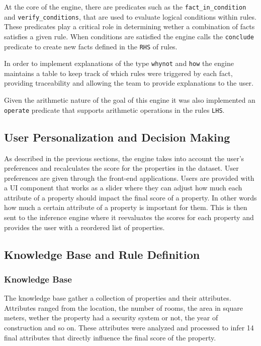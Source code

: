 \documentclass[runningheads]{llncs}
\begin{document}
At the core of the engine, there are predicates such as the \texttt{fact\_in\_condition} and \texttt{verify\_conditions}, that are used to evaluate logical conditions within rules. These predicates play a critical role in determining wether a combination of facts satisfies a given rule.
When conditions are satisfied the engine calls the \texttt{conclude} predicate to create new facts defined in the \texttt{RHS} of rules.

In order to implement explanations of the type \texttt{whynot} and \texttt{how} the engine maintains a table to keep track of which rules were triggered by each fact, providing traceability and allowing the team to provide explanations to the user.

Given the arithmetic nature of the goal of this engine it was also implemented an \texttt{operate} predicate that supports arithmetic operations in the rules \texttt{LHS}.

\subsection{User Personalization and Decision Making}

As described in the previous sections, the engine takes into account the user's preferences and recalculates the score for the properties in the dataset. User preferences are given through the front-end applications. Users are provided with a UI component that works as a slider where they can adjust how much each attribute of a property should impact the final score of a property. In other words how much a certain attribute of a property is important for them.
This is then sent to the inference engine where it reevaluates the scores for each property and provides the user with a reordered list of properties.

\subsection{Knowledge Base and Rule Definition}
\subsubsection{Knowledge Base}

The knowledge base gather a collection of properties and their attributes. Attributes ranged from the location, the number of rooms, the area in square meters, wether the property had a security system or not, the year of construction and so on. These attributes were analyzed and processed to infer 14 final attributes that directly influence the final score of the property.
\end{document}
